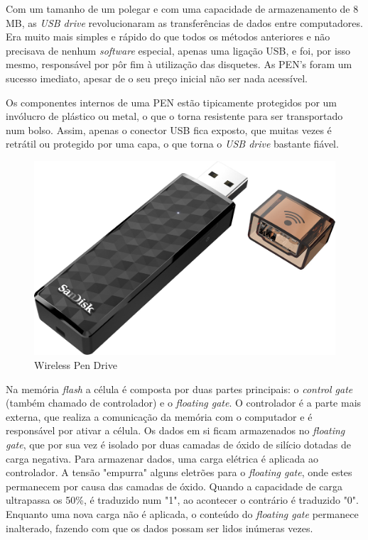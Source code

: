 \documentclass{report}
\begin{document}
	Com um tamanho de um polegar e com uma capacidade de armazenamento de 8 MB, as \textit{USB drive} revolucionaram as transferências de dados entre computadores. Era muito mais simples e rápido do que todos os métodos anteriores e não precisava de nenhum \textit{software} especial, apenas uma ligação USB, e foi, por isso mesmo, responsável por pôr fim à utilização das disquetes. As PEN's foram um sucesso imediato, apesar de o seu preço inicial não ser nada acessível.
\vspace{3mm}
	
	Os componentes internos de uma PEN estão tipicamente protegidos por um invólucro de plástico ou metal, o que o torna resistente para ser transportado num bolso. Assim, apenas o conector USB fica exposto, que muitas vezes é retrátil ou protegido por uma capa, o que torna o \textit{USB drive} bastante fiável.
\vspace{3mm}

\vspace{10mm}
	\begin{figure} [h]
		\centering
		\includegraphics[scale=0.2]{pen.jpg}
		\caption{Wireless Pen Drive}
	\end{figure}

\newpage
	Na memória \textit{flash} a célula é composta por duas partes principais: o \textit{control gate} (também chamado de controlador) e o \textit{floating gate}. O controlador é a parte mais externa, que realiza a comunicação da memória com o computador e é responsável por ativar a célula. Os dados em si ficam armazenados no \textit{floating gate}, que por sua vez é isolado por duas camadas de óxido de silício dotadas de carga negativa.
	Para armazenar dados, uma carga elétrica é aplicada ao controlador. A tensão "empurra" alguns eletrões para o \textit{floating gate}, onde estes permanecem por causa das camadas de óxido. Quando a capacidade de carga ultrapassa os 50\%, é traduzido num "1", ao acontecer o contrário é traduzido "0". Enquanto uma nova carga não é aplicada, o conteúdo do \textit{floating gate} permanece inalterado, fazendo com que os dados possam ser lidos inúmeras vezes.
\vspace{1mm}
\end{document}
